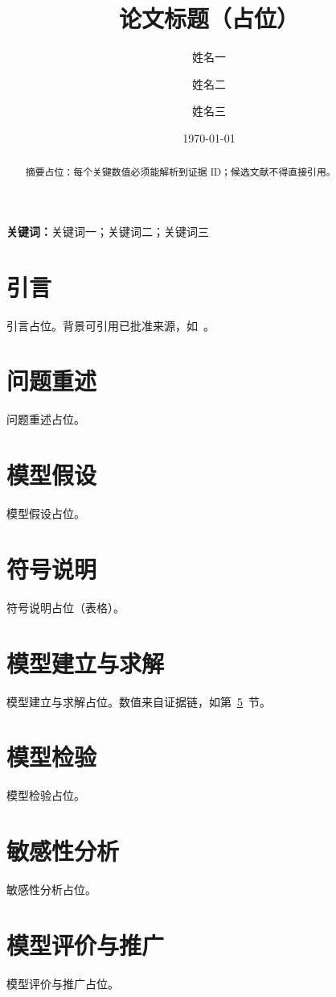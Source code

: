 \documentclass[11pt]{ctexart}
\title{论文标题（占位）}
\author{姓名一 \and 姓名二 \and 姓名三}
\date{\today}
\begin{document}
\maketitle
\begin{abstract}
摘要占位：每个关键数值必须能解析到证据 ID；候选文献不得直接引用。
\end{abstract}
\noindent\textbf{关键词：}关键词一；关键词二；关键词三

\section{引言}\label{sec:intro}
引言占位。背景可引用已批准来源，如~\cite{src_example}。

\section{问题重述}\label{sec:problem}
问题重述占位。

\section{模型假设}\label{sec:assumptions}
模型假设占位。

\section{符号说明}\label{sec:symbols}
符号说明占位（表格）。

\section{模型建立与求解}\label{sec:model}
模型建立与求解占位。数值来自证据链，如第~\ref{sec:model}~节。

\section{模型检验}\label{sec:validation}
模型检验占位。

\section{敏感性分析}\label{sec:sensitivity}
敏感性分析占位。

\section{模型评价与推广}\label{sec:evaluation}
模型评价与推广占位。



\end{document}

